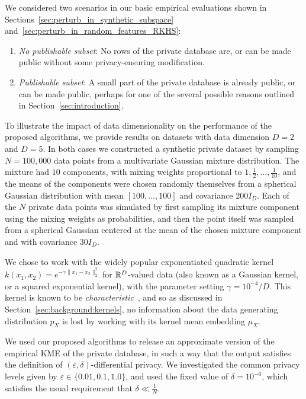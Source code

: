 We considered two scenarios in our basic empirical evaluations shown in Sections~\ref{sec:perturb_in_synthetic_subspace} and~\ref{sec:perturb_in_random_features_RKHS}:
\begin{enumerate}
	\item \emph{No publishable subset}: No rows of the private database are, or can be made public without some privacy-ensuring modification.
	\item \emph{Publishable subset}: A small part of the private database is already public, or can be made public, perhaps for one of the several possible reasons outlined in Section~\ref{sec:introduction}.
\end{enumerate}
To illustrate the impact of data dimensionality on the performance of the proposed algorithms, we provide results on datasets with data dimension $D = 2$ and $D = 5$. In both cases we constructed a synthetic private dataset by sampling $N = 100,000$ data points from a multivariate Gaussian mixture distribution. The mixture had $10$ components, with mixing weights proportional to $1, \frac{1}{2}, \ldots, \frac{1}{10}$, and the means of the components were chosen randomly themselves from a spherical Gaussian distribution with mean $[100, \ldots, 100]$ and covariance $200 I_D$. Each of the $N$ private data points was simulated by first sampling its mixture component using the mixing weights as probabilities, and then the point itself was sampled from a spherical Gaussian centered at the mean of the chosen mixture component and with covariance $30 I_D$.

We chose to work with the widely popular exponentiated quadratic kernel $k(x_1, x_2) = e^{-\gamma \| x_1 - x_2 \|_2^2}$ for $\mathbb{R}^D$-valued data (also known as a Gaussian kernel, or a squared exponential kernel), with the parameter setting $\gamma = 10^{-4} / D$. This kernel is known to be \emph{characteristic}~\cite{FukGreSunSch08}, and so as discussed in Section~\ref{sec:background:kernels}, no information about the data generating distribution $p_X$ is lost by working with its kernel mean embedding $\mu_X$.

We used our proposed algorithms to release an approximate version of the empirical KME of the private database, in such a way that the output satisfies the definition of $(\varepsilon, \delta)$-differential privacy. We investigated the common privacy levels given by $\varepsilon \in \{ 0.01, 0.1, 1.0 \}$, and used the fixed value of $\delta = 10^{-6}$, which satisfies the usual requirement that $\delta \ll \frac{1}{N}$.


